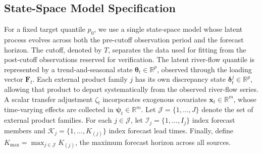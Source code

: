 \documentclass[APA,STIX1COL]{WileyNJD-v2}
\begin{document}
\subsection{State-Space Model Specification}
\label{subsec:fullmodel}

For a fixed target quantile $p_0$, we use a single state-space model whose latent process evolves across both the pre-cutoff observation period and the forecast horizon. The cutoff, denoted by \(T\), separates the data used for fitting from the post-cutoff observations reserved for verification. The latent river-flow quantile is represented by a trend-and-seasonal state \(\boldsymbol{\theta}_t \in \mathbb{R}^p\), observed through the loading vector \(\mathbf{F}_t\). Each external product family \(j\) has its own discrepancy state \(\boldsymbol{\delta}_t^j \in \mathbb{R}^p\), allowing that product to depart systematically from the observed river-flow series. A scalar transfer adjustment \(\zeta_t\) incorporates exogenous covariates \(\mathbf{x}_t \in \mathbb{R}^m\), whose time-varying effects are collected in \(\boldsymbol{\psi}_t \in \mathbb{R}^m\). Let \(\mathcal{J}=\{1,\ldots,J\}\) denote the set of external product families. For each \(j\in\mathcal{J}\), let \(\mathcal{I}_j=\{1,\ldots,I_j\}\) index forecast members and \(\mathcal{K}_j=\{1,\ldots,K_{(j)}\}\) index forecast lead times. Finally, define \(K_{\max}=\max_{j\in\mathcal{J}}K_{(j)}\), the maximum forecast horizon across all sources.
\end{document}

